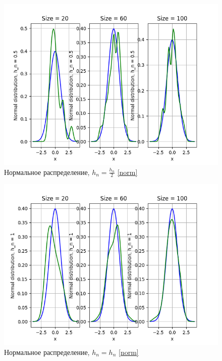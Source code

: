 \documentclass[a4paper]{article}
\begin{document}
        \begin{figure}[H]
            \centering
            \includegraphics[scale = 0.4]{Normal distribution, h_n = 0.5.png}
            \caption{Нормальное распределение, $h_n = \frac{h_n}{2}$ \eqref{norm}}
            \label{fig:cauchy}
        \end{figure}
        
        \begin{figure}[H]
            \centering
            \includegraphics[scale = 0.4]{Normal distribution, h_n = 1.png}
            \caption{Нормальное распределение, $h_n = h_n$ \eqref{norm}}
            \label{fig:cauchy}
        \end{figure}
        
\end{document}
